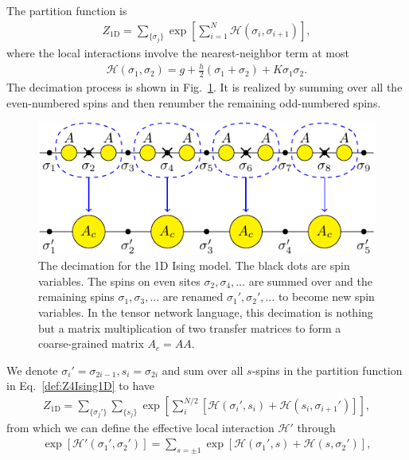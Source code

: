 \documentclass[aps,prr,reprint,superscriptaddress,nofootinbib,floatfix]{revtex4-2}
\begin{document}
The partition function is
%
\begin{align}\label{def:Z4Ising1D}
    Z_{\text{1D}} = \sum_{\{\sigma_j \} } \exp{\left[\sum_{i=1}^N
    \mathscr{H}\left(\sigma_i,\sigma_{i+1}\right)  \right]},
\end{align}
%
where the local interactions involve the nearest-neighbor term at most
%
\begin{align}\label{def:H4Ising1D}
    \mathscr{H}\left(\sigma_1, \sigma_2\right) = g +
    \frac{h}{2}\left(\sigma_1 + \sigma_2\right) + K\sigma_1 \sigma_2.
\end{align}
%
The decimation process is shown in Fig.~\ref{fig:Ising1D-decimation}.
It is realized by summing over all the even-numbered spins and then renumber the remaining odd-numbered spins. 
%
\begin{figure}[t]
    \includegraphics[width=0.9\columnwidth,valign=c]{Ising1D-decimation.pdf}
    \caption{\label{fig:Ising1D-decimation}
        The decimation for the 1D Ising model. 
        The black dots are spin variables. 
        The spins on even sites $\sigma_2,\sigma_4,\ldots$ are summed over and the remaining spins $\sigma_1,\sigma_3,\ldots$ are renamed $\sigma_1',\sigma_2',\ldots$ to become new spin variables. 
        In the tensor network language, this decimation is nothing but a matrix multiplication of two transfer matrices to form a coarse-grained matrix $A_c = AA$.
    }
\end{figure}
%
We denote $\sigma_i'=\sigma_{2i-1}, s_i = \sigma_{2i}$ and sum over all $s$-spins in the partition function in Eq.~\eqref{def:Z4Ising1D} to have
%
\begin{align}\label{eq:oldK2newKZ}
    Z_{\text{1D}} = 
    \sum_{\{\sigma_j'\}} \sum_{\{s_j \}}
    \exp{\left[ \sum_i^{N/2} \left[\mathscr{H}\left(\sigma_i',s_i\right)
    + \mathscr{H}\left(s_i,\sigma_{i+1}'\right)\right]\right]},
\end{align}
%
from which we can define the effective local interaction $\mathscr{H}'$ through
%
\begin{align}\label{eq:oldK2newK}
    \exp{\left[\mathscr{H}'\left(\sigma_1',\sigma_2'\right)\right]} =
    \sum_{s=\pm 1}\exp{\left[\mathscr{H}\left(\sigma_1',s\right) +
        \mathscr{H}\left(s,\sigma_2'\right)\right]},
\end{align}
\end{document}
